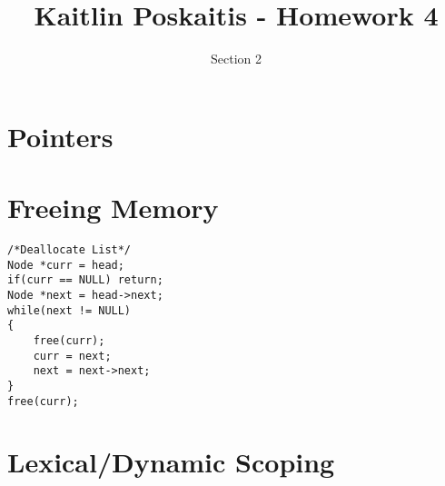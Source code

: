 \documentclass[11pt]{article}
\title{\bf Kaitlin Poskaitis - Homework 4}
\author{Section 2}
\date{}
\begin{document}
\maketitle

\section{Pointers}

\section{Freeing Memory}

\begin{lstlisting}
/*Deallocate List*/
Node *curr = head;
if(curr == NULL) return;
Node *next = head->next;
while(next != NULL)
{
	free(curr);
	curr = next;
	next = next->next;
}
free(curr);

\end{lstlisting}

\section{Lexical/Dynamic Scoping}
\end{document}
